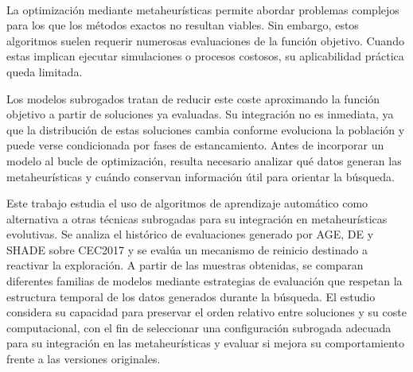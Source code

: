 \chapter*{}
\thispagestyle{empty}

\begin{center}
       {\large\bfseries \myTitle}\\
\end{center}
\begin{center}
       \myName\\
\end{center}

\vspace{0.7cm}
\\

\\

La optimización mediante metaheurísticas permite abordar problemas complejos
para los que los métodos exactos no resultan viables. Sin embargo, estos
algoritmos suelen requerir numerosas evaluaciones de la función objetivo.
Cuando estas implican ejecutar simulaciones o procesos costosos, su
aplicabilidad práctica queda limitada.

Los modelos subrogados tratan de reducir este coste aproximando la función objetivo a partir de soluciones ya evaluadas. Su integración no es inmediata, ya que la distribución de estas soluciones cambia conforme evoluciona la población y puede verse condicionada por fases de estancamiento. Antes de incorporar un modelo al bucle de optimización, resulta necesario analizar qué datos generan las metaheurísticas y cuándo conservan información útil para orientar la búsqueda.

Este trabajo estudia el uso de algoritmos de aprendizaje automático como alternativa a otras técnicas subrogadas para su integración en metaheurísticas evolutivas. Se analiza el histórico de evaluaciones generado por AGE, DE y SHADE sobre CEC2017 y se evalúa un mecanismo de reinicio destinado a reactivar la exploración. A partir de las muestras obtenidas, se comparan diferentes familias de modelos mediante estrategias de evaluación que respetan la estructura temporal de los datos generados durante la búsqueda. El estudio considera su capacidad para preservar el orden relativo entre soluciones y su coste computacional, con el fin de seleccionar una configuración subrogada adecuada para su integración en las metaheurísticas y evaluar si mejora su comportamiento frente a las versiones originales.





